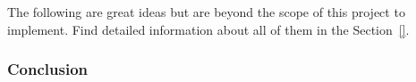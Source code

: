The following are great ideas but are beyond the scope of this project to
implement. Find detailed information about all of them in the
Section~\ref{}. %

\subsubsection{Conclusion} %
\label{sec:Conclusion}


